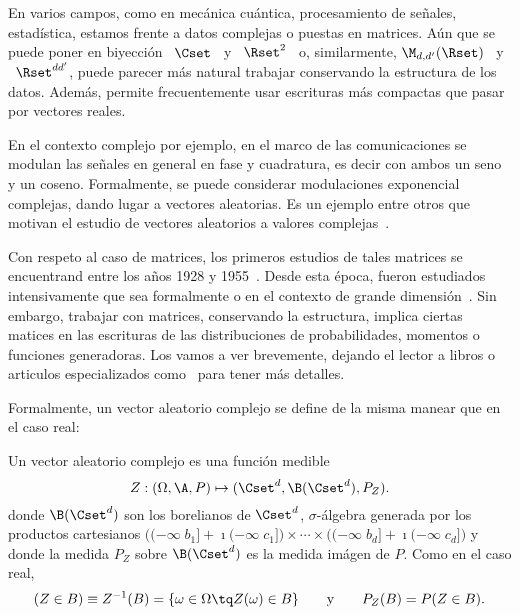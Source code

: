 \label{Sec:MP:VectoresComplejosMatricesAleatorias}

En  varios campos, como  en mec\'anica  cu\'antica, procesamiento  de se\~nales,
estad\'istica, estamos frente a datos complejas o puestas en matrices. A\'un que
se  puede poner en  biyecci\'on \  $\Cset$ \  y \  $\Rset^2$ \  o, similarmente,
$\M_{d,d'}(\Rset)$ \  y \ $\Rset^{d  d'}$, puede parecer m\'as  natural trabajar
conservando la  estructura de los  datos. Adem\'as, permite  frecuentemente usar
escrituras m\'as compactas que pasar por vectores reales.

En  el contexto  complejo por  ejemplo,  en el  marco de  las comunicaciones  se
modulan las  se\~nales en general  en fase y  cuadratura, es decir con  ambos un
seno  y un coseno.   Formalmente, se  puede considerar  modulaciones exponencial
complejas, dando  lugar a  vectores aleatorias.  Es  un ejemplo entre  otros que
motivan  el  estudio de  vectores  aleatorios  a valores  complejas~\cite{Lap17,
  SchSch03, EriKoi06, EriOll09, AmbGae96, Par18}.

Con respeto  al caso  de matrices,  los primeros estudios  de tales  matrices se
encuentrand entre  los a\~nos 1928 y 1955~\cite{Wis28,  NeuGol47, Wig55}.  Desde
esta  \'epoca, fueron  estudiados intensivamente  que  sea formalmente  o en  el
contexto de grande dimensi\'on~\cite{MarPas67, BouPas95}.  Sin embargo, trabajar
con  matrices, \ie  conservando la  estructura, implica  ciertas matices  en las
escrituras  de  las  distribuciones  de  probabilidades,  momentos  o  funciones
generadoras.  Los vamos a ver brevemente, dejando el lector a libros o articulos
especializados  como~\cite{AkeBai15,  GupNag99,  AndGui10,  LivNov18,  EdeRao05,
  Meh04, Car83, Daw81, MezSna08, TulVer04} para tener m\'as detalles.
%
%


\label{Ssec:MP:VAComplejos}

Formalmente, un vector aleatorio complejo se define de la misma manear que en el
caso real:
%
\begin{definicion}
\label{Def:MP:VectorAleatorioComplejo}
%
  Un vector aleatorio complejo es una funci\'on medible
  \[
  Z: (\Omega,\A,P) \mapsto (\Cset^d,\B(\Cset^d),P_Z).
  \]
  donde  $\B(\Cset^d)$  son  los  borelianos  de  $\Cset^d$,  $\sigma$-\'algebra
  generada  por los  productos  cartesianos  $\big( (-\infty  \;  b_1] +  \imath
  (-\infty \;  c_1] \big) \times \cdots  \times \big( (-\infty \;  b_d] + \imath
  (-\infty \;  c_d] \big)$  y donde  la medida $P_Z$  sobre $\B(\Cset^d)$  es la
  medida im\'agen de $P$. Como en el caso real,
  \[
  (Z \in  B) \equiv  Z^{-1}(B) =  \{ \omega \in  \Omega \tq  Z(\omega) \in  B \}
  \qquad \mbox{y} \qquad P_Z(B) = P(Z \in B).
  \]
\end{definicion}


